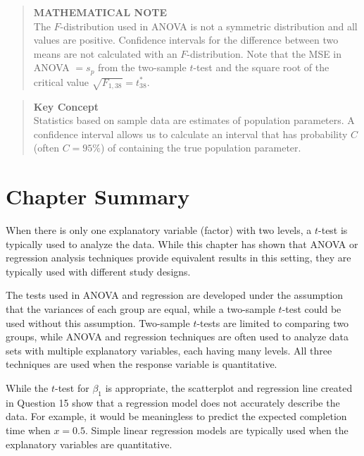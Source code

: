 \documentclass[
]{report}
\begin{document}
\begin{quote}
\textbf{MATHEMATICAL NOTE}\\
The \(F\)-distribution used in ANOVA is not a symmetric distribution and all values are positive. Confidence intervals for the difference between two means are not calculated with an \(F\)-distribution. Note that the MSE in ANOVA \(= s_p\) from the two-sample \(t\)-test and the square root of the critical value \(\sqrt{F_{1,38}} = t^*_{38}\).
\end{quote}

\begin{quote}
\textbf{Key Concept}\\
Statistics based on sample data are estimates of population parameters. A confidence interval allows us to calculate an interval that has probability \(C\) (often \(C=95\%\)) of containing the true population parameter.
\end{quote}

\hypertarget{chapter-summary-1}{%
\section*{\texorpdfstring{\textbf{Chapter Summary}}{Chapter Summary}}\label{chapter-summary-1}}

When there is only one explanatory variable (factor) with two levels, a \(t\)-test is typically used to analyze the data. While this chapter has shown that ANOVA or regression analysis techniques provide equivalent results in this setting, they are typically used with different study designs.

The tests used in ANOVA and regression are developed under the assumption that the variances of each group are equal, while a two-sample \(t\)-test could be used without this assumption. Two-sample \(t\)-tests are limited to comparing two groups, while ANOVA and regression techniques are often used to analyze data sets with multiple explanatory variables, each having many levels. All three techniques are used when the response variable is quantitative.

While the \(t\)-test for \(\beta_1\) is appropriate, the scatterplot and regression line created in Question 15 show that a regression model does not accurately describe the data. For example, it would be meaningless to predict the expected completion time when \(x = 0.5\). Simple linear regression models are typically used when the explanatory variables are quantitative.
\end{document}
